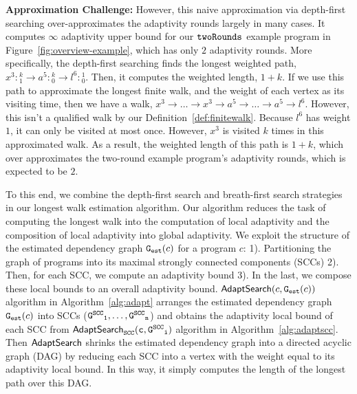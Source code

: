 \textbf{Approximation Challenge:}
However, this naive approximation via depth-first searching over-approximates the adaptivity rounds largely in many cases.
It computes $\infty$ adaptivity upper bound for our $\mathtt{twoRounds}$ example program in Figure~\ref{fig:overview-example}, which has only $2$ adaptivity rounds.
More specifically, the depth-first searching finds the longest weighted path,
$x^3 : {}^{k}_{1} \to a^5 : {}^{k}_{0} \to l^6 : {}^{1}_{0}$.
Then, it computes the weighted length, $1 + k$.
If we use this path to approximate the longest finite walk, and the weight of each vertex as
its visiting time, then we have a walk, $x^3 \to \ldots \to x^3 \to a^5 \to \ldots \to a^5 \to l^6$.
However, this isn't a qualified walk by our Definition~\ref{def:finitewalk}.
Because $l^6$ has weight $1$, it can only be visited at most once. 
%
However, $x^3$ is visited $k$ times in this approximated walk.
As a result,
the weighted length of this path is $1 + k$, which
over approximates 
the two-round example program's adaptivity rounds, which is expected to be $2$. 

To this end, we combine the 
depth-first search and breath-first search strategies in our longest walk estimation algorithm.
%
Our algorithm reduces the task of computing the longest walk into the computation of local adaptivity and the composition of
local adaptivity into global adaptivity.
%
We exploit the structure of the estimated dependency graph $\mathtt{{G_{est}}}(c)$ for a program $c$: 
1). Partitioning the graph of programs into its maximal strongly connected components (SCCs) 
2). Then, for each SCC, we compute an adaptivity bound
3). In the last, we compose these local bounds to an overall adaptivity bound.
%
$\mathsf{AdaptSearch}(c, \mathtt{{G_{est}}}(c))$ algorithm in Algorithm~\ref{alg:adapt} arranges the estimated dependency graph $\mathtt{{G_{est}}}(c)$ into SCCs ($\mathtt{\mathtt{G^{SCC}}_1}, \ldots, \mathtt{\mathtt{G^{SCC}}_n}$) and obtains the adaptivity local bound of each SCC from $\mathtt{\mathsf{AdaptSearch}_{SCC}(c, \mathtt{G^{SCC}}_i)}$ algorithm in Algorithm~\ref{alg:adaptscc}.
Then $\mathsf{AdaptSearch}$ shrinks the estimated dependency graph into a directed acyclic graph (DAG) by reducing each SCC into a vertex with the weight equal to its adaptivity local bound.
In this way, it simply computes the length of the longest path over this DAG.

